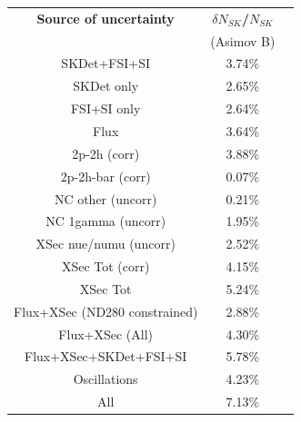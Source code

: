 \begin{table}[htb]
\centering
\begin{tabular}{| c | c | c |}
\hline
  {\bf Source of uncertainty}    & \multicolumn{1}{c|}{{\bf ${\delta}N_{SK}$/$N_{SK}$}}\\
                                 & \multicolumn{1}{c|}{(Asimov B)}\\

\hline
\hline  
SKDet+FSI+SI                   & 3.74\%                        \\
SKDet only                   & 2.65\%                        \\
FSI+SI only                   & 2.64\%                        \\
\hline
  Flux                           & 3.64\%                        \\
\hline
\hline
  2p-2h (corr)                     & 3.88\%                        \\
  2p-2h-bar (corr)                  & 0.07\%                        \\
  NC other (uncorr)              & 0.21\%                        \\
  NC 1gamma (uncorr)             & 1.95\%                        \\
  XSec nue/numu (uncorr)                 & 2.52\%                        \\
\hline
  XSec Tot (corr)                  & 4.15\%                        \\
  XSec Tot                       & 5.24\%                        \\
\hline
\hline
  Flux+XSec (ND280 constrained)                      & 2.88\%                        \\
  Flux+XSec (All)                      & 4.30\%                        \\
\hline
\hline
  Flux+XSec+SKDet+FSI+SI         & 5.78\%                        \\
\hline
\hline
  Oscillations                   & 4.23\%                        \\
\hline
\hline
  All                            & 7.13\%                        \\
\hline
\hline


\end{tabular}
\end{table}
